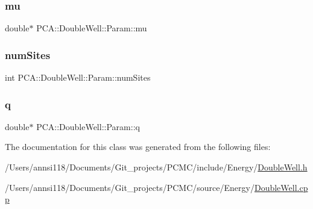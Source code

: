 \hypertarget{class_p_c_a_1_1_double_well_1_1_param_a13ed4bc4bb0d5dea03d9bf1c2fa32e23}{}\label{class_p_c_a_1_1_double_well_1_1_param_a13ed4bc4bb0d5dea03d9bf1c2fa32e23} 
\subsubsection{\texorpdfstring{mu}{mu}}
{\footnotesize\ttfamily double$\ast$ P\+C\+A\+::\+Double\+Well\+::\+Param\+::mu}

\hypertarget{class_p_c_a_1_1_double_well_1_1_param_a7eec05c2eaffdf4dca9bd8a2c6ef0e79}{}\label{class_p_c_a_1_1_double_well_1_1_param_a7eec05c2eaffdf4dca9bd8a2c6ef0e79} 
\subsubsection{\texorpdfstring{num\+Sites}{numSites}}
{\footnotesize\ttfamily int P\+C\+A\+::\+Double\+Well\+::\+Param\+::num\+Sites}

\hypertarget{class_p_c_a_1_1_double_well_1_1_param_a5d2ba876bef9280235a85a5b348f0fe0}{}\label{class_p_c_a_1_1_double_well_1_1_param_a5d2ba876bef9280235a85a5b348f0fe0} 
\subsubsection{\texorpdfstring{q}{q}}
{\footnotesize\ttfamily double$\ast$ P\+C\+A\+::\+Double\+Well\+::\+Param\+::q}



The documentation for this class was generated from the following files\+:\begin{DoxyCompactItemize}
\item 
/\+Users/annsi118/\+Documents/\+Git\+\_\+projects/\+P\+C\+M\+C/include/\+Energy/\hyperlink{_double_well_8h}{Double\+Well.\+h}\item 
/\+Users/annsi118/\+Documents/\+Git\+\_\+projects/\+P\+C\+M\+C/source/\+Energy/\hyperlink{_double_well_8cpp}{Double\+Well.\+cpp}\end{DoxyCompactItemize}
